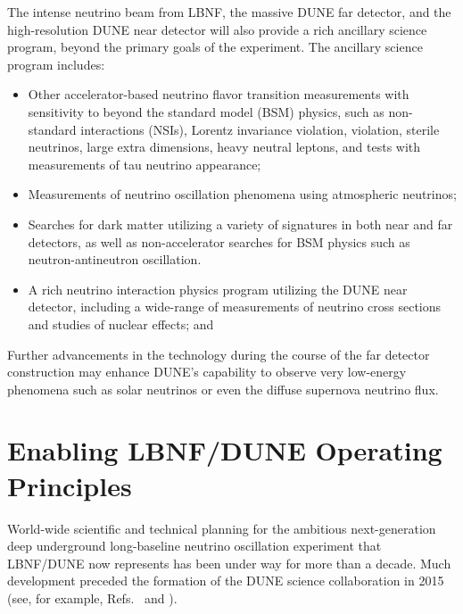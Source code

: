 The intense neutrino beam from LBNF, the massive DUNE \lartpc
far detector, and the high-resolution DUNE near detector will also
provide a rich ancillary science program, beyond the primary goals
of the experiment. The ancillary science program includes:
\begin{itemize}

\item Other accelerator-based neutrino flavor transition measurements with
      sensitivity to beyond the standard model (BSM) physics, such as non-standard
      interactions (NSIs), Lorentz invariance violation,  violation,
      sterile neutrinos, large extra dimensions, heavy neutral leptons,
      and tests with measurements of tau neutrino appearance;

     \item Measurements of neutrino oscillation phenomena using atmospheric neutrinos;


     \item Searches for dark matter utilizing a variety of
           signatures in both
           near and far detectors, as well as  
           non-accelerator searches for BSM physics 
           such as neutron-antineutron oscillation.

     \item A rich neutrino interaction physics program utilizing the DUNE near detector,
           including a wide-range of measurements of neutrino cross sections and studies of
           nuclear effects; and

\end{itemize}

Further advancements in the \lartpc %
technology during the course of the far detector construction
may enhance DUNE's capability to observe very low-energy
phenomena such as solar neutrinos or even the diffuse
supernova neutrino flux.

\section{Enabling LBNF/DUNE Operating Principles}
\label{sec:exec-phys-operatingprinciples}

World-wide scientific and technical planning for the
ambitious next-generation deep underground long-baseline
neutrino oscillation experiment that LBNF/DUNE now represents
has been under way for more than a decade.  Much
development preceded the formation of the DUNE science
collaboration in 2015 (see, for example,
Refs.~\cite{Adams:2013qkq} and \cite{LAGUNA-LBNO-deliv}).

